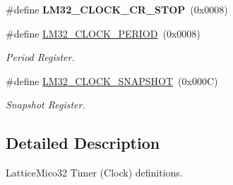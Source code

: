 \begin{DoxyCompactItemize}
\item 
\mbox{\label{group__lm32__clock_ga855af4eb1fc5a30a187c6c4ef01704fb}} 
\#define {\bfseries L\+M32\+\_\+\+C\+L\+O\+C\+K\+\_\+\+C\+R\+\_\+\+S\+T\+OP}~(0x0008)
\item 
\mbox{\label{group__lm32__clock_gab9a859c6de09cb64273edd246c92ca7c}} 
\#define \mbox{\hyperlink{group__lm32__clock_gab9a859c6de09cb64273edd246c92ca7c}{L\+M32\+\_\+\+C\+L\+O\+C\+K\+\_\+\+P\+E\+R\+I\+OD}}~(0x0008)
\begin{DoxyCompactList}\small\item\em Period Register. \end{DoxyCompactList}\item 
\mbox{\label{group__lm32__clock_gab5ee2f295829e0df01f036382ad2f3a8}} 
\#define \mbox{\hyperlink{group__lm32__clock_gab5ee2f295829e0df01f036382ad2f3a8}{L\+M32\+\_\+\+C\+L\+O\+C\+K\+\_\+\+S\+N\+A\+P\+S\+H\+OT}}~(0x000\+C)
\begin{DoxyCompactList}\small\item\em Snapshot Register. \end{DoxyCompactList}\end{DoxyCompactItemize}


\subsection{Detailed Description}
Lattice\+Mico32 Timer (Clock) definitions. 


